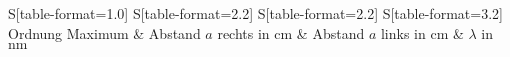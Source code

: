 \begin{table}
    \centering
    \caption{Berechnung der Wellenlänge $\lambda$ durch die Abstände der Interferenzmaxima}
    \label{tab:Wellenlaenge}
    \begin{tabular}{
	S[table-format=1.0]
	S[table-format=2.2]
	S[table-format=2.2]
	S[table-format=3.2]
	}
	\toprule
	{Ordnung Maximum }		& {Abstand $a$ rechts in \si{\centi\meter}}		& 
	{Abstand $a$ links in \si{\centi\meter}}		& {$\lambda$ in $\si{\nano\meter}$}		\\ 
	\midrule
    
    \bottomrule
    \end{tabular}
    \end{table}
